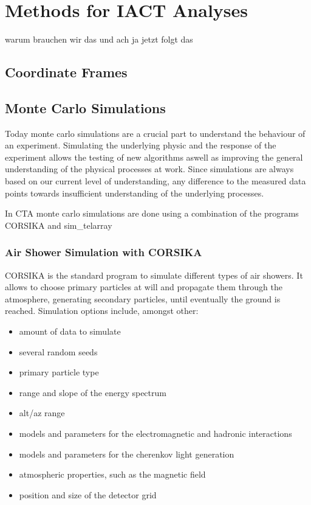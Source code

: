 \chapter{Methods for IACT Analyses}
warum brauchen wir das und ach ja jetzt folgt das

\section{Coordinate Frames}

\section{Monte Carlo Simulations}
Today monte carlo simulations are a crucial part to 
understand the behaviour of an experiment. 
Simulating the underlying physic and the response of the experiment
allows the testing of new algorithms aswell as improving the general understanding
of the physical processes at work. Since simulations are always based on our 
current level of understanding, any difference to the measured data
points towards insufficient understanding of the underlying processes.

In CTA monte carlo simulations are done using a combination of the
programs CORSIKA and sim\_telarray

\subsection{Air Shower Simulation with CORSIKA}
CORSIKA \cite{heck1998corsika} is the standard program to simulate different types of
air showers. It allows to choose primary particles at will and
propagate them through the atmosphere, generating secondary particles, until
eventually the ground is reached.
Simulation options include, amongst other:
\begin{itemize}
  \item amount of data to simulate
  \item several random seeds
  \item primary particle type
  \item range and slope of the energy spectrum
  \item alt/az range
  \item models and parameters for the electromagnetic and hadronic interactions
  \item models and parameters for the cherenkov light generation
  \item atmospheric properties, such as the magnetic field
  \item position and size of the detector grid
\end{itemize}

